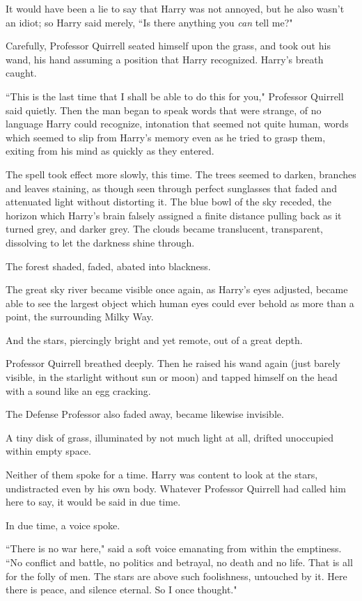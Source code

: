 It would have been a lie to say that Harry was not annoyed, but he also wasn't an idiot; so Harry said merely, ``Is there anything you \emph{can} tell me?"

Carefully, Professor Quirrell seated himself upon the grass, and took out his wand, his hand assuming a position that Harry recognized. Harry's breath caught.

``This is the last time that I shall be able to do this for you," Professor Quirrell said quietly. Then the man began to speak words that were strange, of no language Harry could recognize, intonation that seemed not quite human, words which seemed to slip from Harry's memory even as he tried to grasp them, exiting from his mind as quickly as they entered.

The spell took effect more slowly, this time. The trees seemed to darken, branches and leaves staining, as though seen through perfect sunglasses that faded and attenuated light without distorting it. The blue bowl of the sky receded, the horizon which Harry's brain falsely assigned a finite distance pulling back as it turned grey, and darker grey. The clouds became translucent, transparent, dissolving to let the darkness shine through.

The forest shaded, faded, abated into blackness.

The great sky river became visible once again, as Harry's eyes adjusted, became able to see the largest object which human eyes could ever behold as more than a point, the surrounding Milky Way.

And the stars, piercingly bright and yet remote, out of a great depth.

Professor Quirrell breathed deeply. Then he raised his wand again (just barely visible, in the starlight without sun or moon) and tapped himself on the head with a sound like an egg cracking.

The Defense Professor also faded away, became likewise invisible.

A tiny disk of grass, illuminated by not much light at all, drifted unoccupied within empty space.

Neither of them spoke for a time. Harry was content to look at the stars, undistracted even by his own body. Whatever Professor Quirrell had called him here to say, it would be said in due time.

In due time, a voice spoke.

``There is no war here," said a soft voice emanating from within the emptiness. ``No conflict and battle, no politics and betrayal, no death and no life. That is all for the folly of men. The stars are above such foolishness, untouched by it. Here there is peace, and silence eternal. So I once thought."

